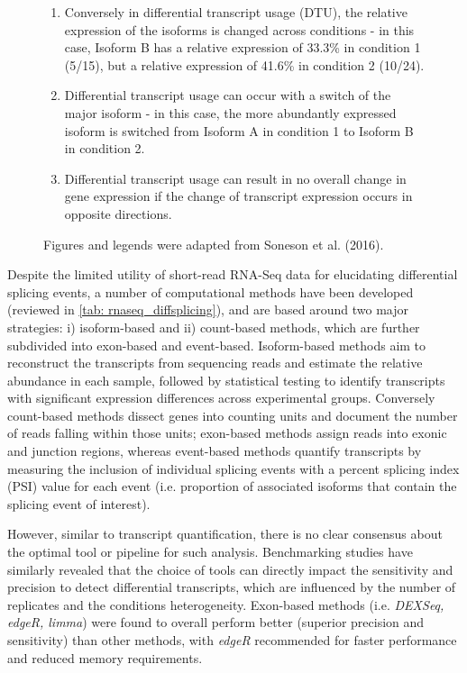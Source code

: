 \begin{figure}[htp]
{\begin{enumerate}[label=\textbf{\Alph*})]
		\item Conversely in differential transcript usage (DTU), the relative expression of the isoforms is changed across conditions - in this case, Isoform B has a relative expression of 33.3\% in condition 1 (5/15), but a relative expression of 41.6\% in condition 2 (10/24).
		\item Differential transcript usage can occur with a switch of the major isoform - in this case, the more abundantly expressed isoform is switched from Isoform A in condition 1 to Isoform B in condition 2. 
		\item Differential transcript usage can result in no overall change in gene expression if the change of transcript expression occurs in opposite directions.
		\\
	\end{enumerate} 
	Figures and legends were adapted from Soneson et al. (2016)\cite{Soneson2016}. 
   }
	\label{fig:dte_dtu_explanation}
\end{figure}

Despite the limited utility of short-read RNA-Seq data for elucidating differential splicing events, a number of computational methods have been developed (reviewed in \cref{tab: rnaseq_diffsplicing}), and are based around two major strategies: i) isoform-based and ii) count-based methods, which are further subdivided into exon-based and event-based. Isoform-based methods aim to reconstruct the transcripts from sequencing reads and estimate the relative abundance in each sample, followed by statistical testing to identify transcripts with significant expression differences across experimental groups\cite{Mehmood2020}. Conversely count-based methods dissect genes into counting units and document the number of reads falling within those units\cite{Mehmood2020}; exon-based methods assign reads into exonic and junction regions, whereas event-based methods quantify transcripts by measuring the inclusion of individual splicing events with a percent splicing index (PSI) value for each event (i.e. proportion of associated isoforms that contain the splicing event of interest). 

However, similar to transcript quantification, there is no clear consensus about the optimal tool or pipeline for such analysis. Benchmarking studies have similarly revealed that the choice of tools can directly impact the sensitivity and precision to detect differential transcripts, which are influenced by the number of replicates and the conditions heterogeneity\cite{Merino2019}. Exon-based methods (i.e. \textit{DEXSeq, edgeR, limma}) were found to overall perform better (superior precision and sensitivity) than other methods, with \textit{edgeR} recommended for faster performance and reduced memory requirements\cite{Mehmood2020}. 


